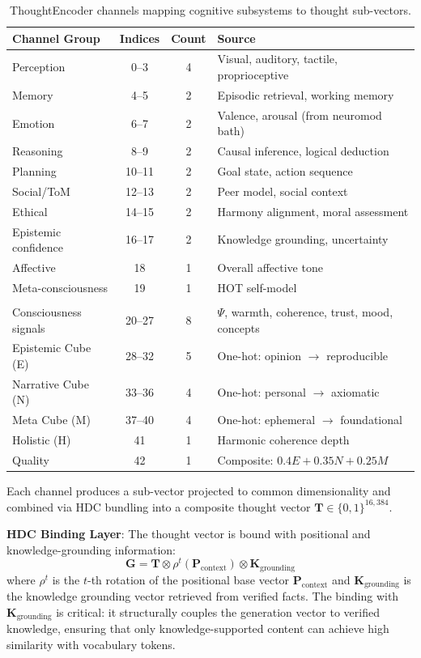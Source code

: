 \documentclass[12pt]{book}
\newcommand{\bind}{\otimes}
\begin{document}
\begin{table}[H]
\centering
\caption{ThoughtEncoder channels mapping cognitive subsystems to thought sub-vectors.}
\label{tab:thought-channels}
\begin{tabular}{lccl}
\toprule
\textbf{Channel Group} & \textbf{Indices} & \textbf{Count} & \textbf{Source} \\
\midrule
Perception & 0--3 & 4 & Visual, auditory, tactile, proprioceptive \\
Memory & 4--5 & 2 & Episodic retrieval, working memory \\
Emotion & 6--7 & 2 & Valence, arousal (from neuromod bath) \\
Reasoning & 8--9 & 2 & Causal inference, logical deduction \\
Planning & 10--11 & 2 & Goal state, action sequence \\
Social/ToM & 12--13 & 2 & Peer model, social context \\
Ethical & 14--15 & 2 & Harmony alignment, moral assessment \\
Epistemic confidence & 16--17 & 2 & Knowledge grounding, uncertainty \\
Affective & 18 & 1 & Overall affective tone \\
Meta-consciousness & 19 & 1 & HOT self-model \\
\addlinespace
\multicolumn{4}{l}{\textit{Extended channels (added post-initial design):}} \\
Consciousness signals & 20--27 & 8 & $\Psi$, warmth, coherence, trust, mood, concepts \\
Epistemic Cube (E) & 28--32 & 5 & One-hot: opinion $\to$ reproducible \\
Narrative Cube (N) & 33--36 & 4 & One-hot: personal $\to$ axiomatic \\
Meta Cube (M) & 37--40 & 4 & One-hot: ephemeral $\to$ foundational \\
Holistic (H) & 41 & 1 & Harmonic coherence depth \\
Quality & 42 & 1 & Composite: $0.4E + 0.35N + 0.25M$ \\
\bottomrule
\end{tabular}
\end{table}

Each channel produces a sub-vector projected to common dimensionality and combined via HDC bundling into a composite thought vector $\mathbf{T} \in \{0,1\}^{16{,}384}$.

\textbf{HDC Binding Layer}: The thought vector is bound with positional and knowledge-grounding information:
\begin{equation}\label{eq:broca-binding}
\mathbf{G} = \mathbf{T} \bind \rho^t(\mathbf{P}_{\text{context}}) \bind \mathbf{K}_{\text{grounding}}
\end{equation}
where $\rho^t$ is the $t$-th rotation of the positional base vector $\mathbf{P}_{\text{context}}$ and $\mathbf{K}_{\text{grounding}}$ is the knowledge grounding vector retrieved from verified facts. The binding with $\mathbf{K}_{\text{grounding}}$ is critical: it structurally couples the generation vector to verified knowledge, ensuring that only knowledge-supported content can achieve high similarity with vocabulary tokens.
\end{document}
